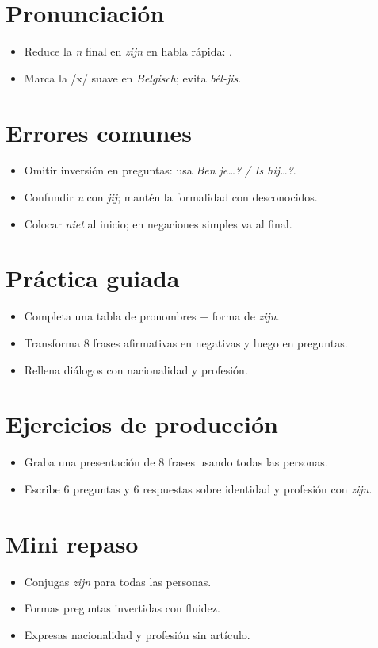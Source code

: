\section{Pronunciación}
\begin{itemize}[leftmargin=*]
	\item Reduce la \textit{n} final en \textit{zijn} en habla rápida: .
	\item Marca la /x/ suave en \textit{Belgisch}; evita \textit{bél-jis}.
\end{itemize}

\section{Errores comunes}
\begin{itemize}[leftmargin=*]
	\item Omitir inversión en preguntas: usa \textit{Ben je\ldots? / Is hij\ldots?}.
	\item Confundir \textit{u} con \textit{jij}; mantén la formalidad con desconocidos.
	\item Colocar \textit{niet} al inicio; en negaciones simples va al final.
\end{itemize}

\section{Práctica guiada}
\begin{itemize}[leftmargin=*]
	\item Completa una tabla de pronombres + forma de \textit{zijn}.
	\item Transforma 8 frases afirmativas en negativas y luego en preguntas.
	\item Rellena diálogos con nacionalidad y profesión.
\end{itemize}

\section{Ejercicios de producción}
\begin{itemize}[leftmargin=*]
	\item Graba una presentación de 8 frases usando todas las personas.
	\item Escribe 6 preguntas y 6 respuestas sobre identidad y profesión con \textit{zijn}.
\end{itemize}

\section{Mini repaso}
\begin{itemize}[leftmargin=*]
	\item Conjugas \textit{zijn} para todas las personas.
	\item Formas preguntas invertidas con fluidez.
	\item Expresas nacionalidad y profesión sin artículo.
\end{itemize}


